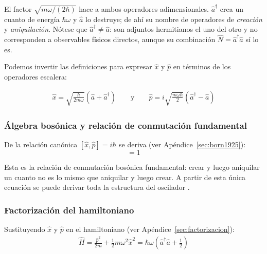 El factor $\sqrt{m\omega/(2\hbar)}$ hace a ambos operadores adimensionales. $\hat{a}^\dagger$ crea un cuanto de energía $\hbar\omega$ y $\hat{a}$ lo destruye; de ahí su nombre de operadores de \emph{creación} y \emph{aniquilación}. Nótese que $\hat{a}^\dagger \neq \hat{a}$: son adjuntos hermitianos el uno del otro y no corresponden a observables físicos directos, aunque su combinación $\hat{N} = \hat{a}^\dagger\hat{a}$ sí lo es.

Podemos invertir las definiciones para expresar $\hat{x}$ y $\hat{p}$ en términos de los operadores escalera:

\vspace{-25pt}	
\begin{align}
\hat{x} = \sqrt{\frac{\hbar}{2m\omega}}(\hat{a} + \hat{a}^\dagger) \qquad \text{y} \qquad
\hat{p} = i\sqrt{\frac{m\omega\hbar}{2}}(\hat{a}^\dagger - \hat{a})
\end{align}


\subsubsection{Álgebra bosónica y relación de conmutación fundamental}

De la relación canónica $[\hat{x}, \hat{p}] = i\hbar$ se deriva (ver Apéndice~\ref{sec:born1925}):
\vspace{-15pt}	
\begin{equation}
	[\hat{a}, \hat{a}^\dagger] = 1
	\label{eq:conmutador}
\end{equation}

Esta es la relación de conmutación bosónica fundamental: crear y luego aniquilar un cuanto no es lo mismo que aniquilar y luego crear. A partir de esta única ecuación se puede derivar toda la estructura del oscilador \citep{bornheisenberg1926}.




\subsubsection{Factorización del hamiltoniano}

Sustituyendo $\hat{x}$ y $\hat{p}$ en el hamiltoniano  \citep{dirac1930} (ver Apéndice~\ref{sec:factorizacion}):
\vspace{-5pt}	
\begin{align}
	\hat{H} = \frac{\hat{p}^2}{2m} + \frac{1}{2}m\omega^2\hat{x}^2 
	= \hbar\omega\left(\hat{a}^\dagger\hat{a} + \frac{1}{2}\right)
\end{align}

